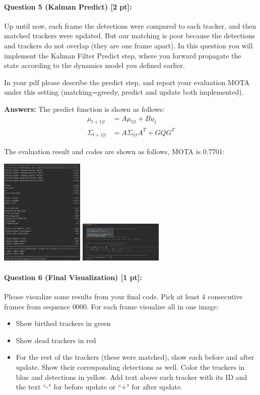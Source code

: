 \documentclass[11pt]{article}
\begin{document}
\paragraph{Question 5 (Kalman Predict) [2 pt]:}
Up until now, each frame the detections were compared to each tracker, and then matched trackers were updated. But our matching is poor because the detections and trackers do not overlap (they are one frame apart). In this question you will implement the Kalman Filter Predict step, where you forward propagate the state according to the dynamics model you defined earlier.

In your pdf please describe the predict step, and report your evaluation MOTA under this setting (matching=greedy, predict and update both implemented).

\textbf{Answers:} The predict function is shown as follows:
\begin{align}
    \mu_{t+1|t} &= A\mu_{t|t} + B\underline{u}_{t} \label{eq:kf6}\\
    \Sigma_{t+1|t} &= A\Sigma_{t|t}A^T + GQG^T \label{eq:kf7}
\end{align}

The evaluation result and codes are shown as follows, MOTA is 0.7701:
\begin{center}
    \includegraphics[width=0.3\textwidth]{./fig/Q5_results.png}
    \includegraphics[width=0.3\textwidth]{./fig/Q5_code.png}
\end{center}

\paragraph{Question 6 (Final Visualization) [1 pt]:}
Please visualize some results from your final code. 
Pick at least 4 consecutive frames from sequence 0000. For each frame visualize all in one image:
\begin{itemize}
    \item Show birthed trackers in green
    \item Show dead trackers in red
    \item For the rest of the trackers (these were matched), show each before and after update. Show their corresponding detections as well. Color the trackers in blue and detections in yellow. Add text above each tracker with its ID and the text ``-" for before update or ``+" for after update.  
\end{itemize}
\end{document}
